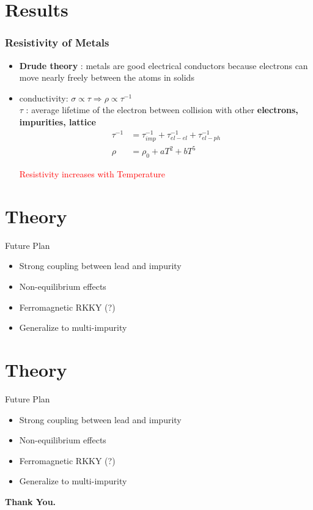 \documentclass{beamer}
\begin{document}
\section{Results}
\begin{frame}
	\frametitle{Resistivity of Metals }

	\begin{itemize}
		\item \textbf{ Drude theory }: metals are good electrical conductors because electrons can move nearly freely between the atoms in solids

		\item conductivity: \Large{ $\sigma \propto \tau \Rightarrow \rho \propto \tau^{-1} $ } \\

		      $\tau$ : average lifetime of the electron between collision with other \textbf{electrons, impurities, lattice}
		      \begin{align}
			      \tau^{-1} & = \tau^{-1}_{imp} + \tau^{-1}_{el-el} + \tau^{-1}_{el-ph}\nonumber \\
			      \rho      & = \rho_0 + aT^2 + bT^5 \nonumber
		      \end{align}

		      \textcolor{red}{Resistivity increases with Temperature}
	\end{itemize}
\end{frame}

\section{Theory}
\begin{frame}[plain]
	\begin{alertblock}{Future Plan}
		\begin{itemize}
			\item Strong coupling between lead and impurity
			\item Non-equilibrium effects
			\item Ferromagnetic RKKY (?)
			\item Generalize to multi-impurity
		\end{itemize}
	\end{alertblock}
\end{frame}

\section{Theory}
\begin{frame}[plain]
	\begin{block}{Future Plan}
		\begin{itemize}
			\item Strong coupling between lead and impurity
			\item Non-equilibrium effects
			\item Ferromagnetic RKKY (?)
			\item Generalize to multi-impurity
		\end{itemize}
	\end{block}
\end{frame}


\begin{frame}[plain]
	\begin{center}
		{\fontsize{50}{60}\selectfont \textbf{ Thank You.}}
	\end{center}
\end{frame}
\end{document}
